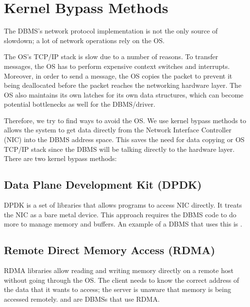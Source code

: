 \documentclass[11pt]{article}
\begin{document}
\section{Kernel Bypass Methods}
The DBMS's network protocol implementation is not the only source of slowdown; a lot of network operations rely on the OS. 

The OS's TCP/IP stack is slow due to a number of reasons. To transfer messages, the OS has to perform expensive context switches and interrupts. Moreover, in order to send a message, the OS copies the packet to prevent it being deallocated before the packet reaches the networking hardware layer. The OS also maintains its own latches for its own data structures, which can become potential bottlenecks as well for the DBMS/driver.

Therefore, we try to find ways to avoid the OS. We use kernel bypass methods to allows the system to get data directly from the Network Interface Controller (NIC) into the DBMS address space. This saves the need for data copying or OS TCP/IP stack since the DBMS will be talking directly to the hardware layer. There are two kernel bypass methods:

\subsection*{Data Plane Development Kit (DPDK)}
DPDK is a set of libraries that allows programs to access NIC directly. It treats the NIC as a bare metal device. This approach requires the DBMS code to do more to manage memory and buffers. An example of a DBMS that uses this is .

\subsection*{Remote Direct Memory Access (RDMA)}
RDMA libraries allow reading and writing memory directly on a remote host without going through the OS. The client needs to know the correct address of the data that it wants to access; the server is unaware that memory is being accessed remotely.  and  are DBMSs that use RDMA.

\newpage


\end{document}
